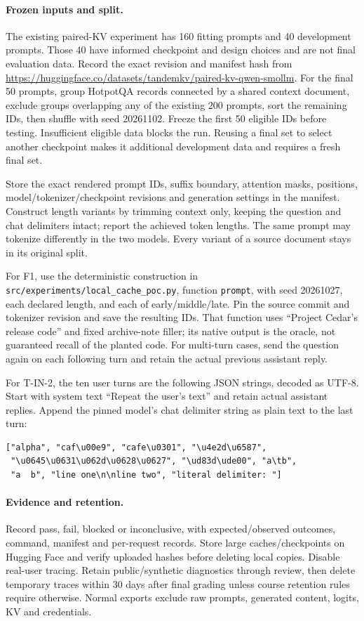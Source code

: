 \documentclass[12pt, titlepage]{article}
\begin{document}
\paragraph{Frozen inputs and split.}
The existing paired-KV experiment has 160 fitting prompts and 40 development
prompts. Those 40 have informed checkpoint and design choices and are not
final evaluation data. Record the exact revision and manifest hash from
\url{https://huggingface.co/datasets/tandemkv/paired-kv-qwen-smollm}.
For the final 50 prompts, group HotpotQA records connected by a shared
context document, exclude groups overlapping any of the existing 200
prompts, sort the remaining IDs, then shuffle with seed 20261102. Freeze
the first 50 eligible IDs before testing. Insufficient eligible data blocks
the run. Reusing a final set to select another checkpoint makes it
additional development data and requires a fresh final set.

Store the exact rendered prompt IDs, suffix boundary, attention masks,
positions, model/tokenizer/checkpoint revisions and generation settings in
the manifest. Construct length variants by trimming context only, keeping
the question and chat delimiters intact; report the achieved token lengths.
The same prompt may tokenize differently in the two models. Every variant
of a source document stays in its original split.

For F1, use the deterministic construction in
\texttt{src/experiments/local\_cache\_poc.py}, function \texttt{prompt},
with seed 20261027, each declared length, and each of early/middle/late.
Pin the source commit and tokenizer revision and save the resulting IDs.
That function uses ``Project Cedar's release code'' and fixed archive-note
filler; its native output is the oracle, not guaranteed recall of the planted code.
For multi-turn cases, send the question again on each following turn and
retain the actual previous assistant reply.

For T-IN-2, the ten user turns are the following JSON strings, decoded as
UTF-8. Start with system text ``Repeat the user's text'' and retain actual
assistant replies. Append the pinned model's chat delimiter string as plain
text to the last turn:
\begin{verbatim}
["alpha", "caf\u00e9", "cafe\u0301", "\u4e2d\u6587",
 "\u0645\u0631\u062d\u0628\u0627", "\ud83d\ude00", "a\tb",
 "a  b", "line one\n\nline two", "literal delimiter: "]
\end{verbatim}

\paragraph{Evidence and retention.}
Record pass, fail, blocked or inconclusive, with expected/observed outcomes,
command, manifest and per-request records. Store large caches/checkpoints
on Hugging Face and verify uploaded hashes before deleting local copies.
Disable real-user tracing. Retain public/synthetic diagnostics through
review, then delete temporary traces within 30 days after final grading
unless course retention rules require otherwise. Normal exports exclude
raw prompts, generated content, logits, KV and credentials.
\end{document}
